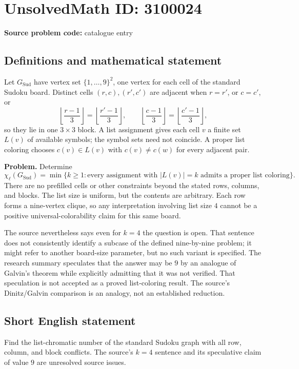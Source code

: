 \documentclass[11pt]{article}
\begin{document}
\section*{UnsolvedMath ID: 3100024}
\textbf{Source problem code:} catalogue entry
\subsection{Definitions and mathematical statement}
Let $G_{\mathrm{Sud}}$ have vertex set $\{1,\ldots,9\}^2$, one vertex for each cell of the standard Sudoku board. Distinct cells $(r,c),(r',c')$ are adjacent when $r=r'$, or $c=c'$, or
\[
\left\lfloor\frac{r-1}{3}\right\rfloor=\left\lfloor\frac{r'-1}{3}\right\rfloor,
\qquad
\left\lfloor\frac{c-1}{3}\right\rfloor=\left\lfloor\frac{c'-1}{3}\right\rfloor,
\]
so they lie in one $3\times3$ block. A list assignment gives each cell $v$ a finite set $L(v)$ of available symbols; the symbol sets need not coincide. A proper list coloring chooses $c(v)\in L(v)$ with $c(v)\ne c(w)$ for every adjacent pair.

\textbf{Problem.} Determine
\[
\chi_{\ell}(G_{\mathrm{Sud}})=\min\{k\geq1:\text{every assignment with }|L(v)|=k
\text{ admits a proper list coloring}\}.
\]
There are no prefilled cells or other constraints beyond the stated rows, columns, and blocks. The list size is uniform, but the contents are arbitrary. Each row forms a nine-vertex clique, so any interpretation involving list size $4$ cannot be a positive universal-colorability claim for this same board.

The source nevertheless says even for $k=4$ the question is open. That sentence does not consistently identify a subcase of the defined nine-by-nine problem; it might refer to another board-size parameter, but no such variant is specified. The research summary speculates that the answer may be $9$ by an analogue of Galvin's theorem while explicitly admitting that it was not verified. That speculation is not accepted as a proved list-coloring result. The source’s Dinitz/Galvin comparison is an analogy, not an established reduction.
\subsection{Short English statement}
Find the list-chromatic number of the standard Sudoku graph with all row, column, and block conflicts. The source’s $k=4$ sentence and its speculative claim of value $9$ are unresolved source issues.
\end{document}
